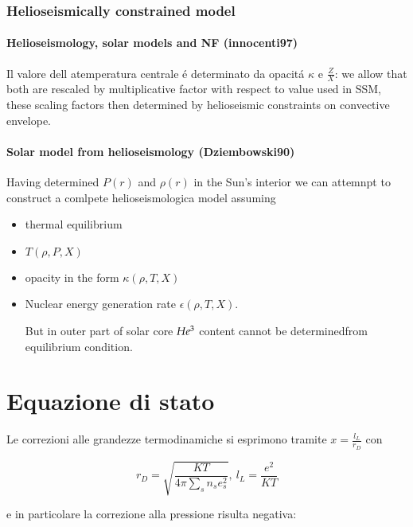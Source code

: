 \documentclass[oneside,12pt,fleqn]{memoir}
\begin{document}
\clearpage

\subsection{Helioseismically constrained model}

\subsubsection{Helioseismology, solar models and NF (innocenti97)}

Il valore dell atemperatura centrale \'e determinato da opacit\'a $\kappa$ e $\frac{Z}{X}$: we allow that both are rescaled by multiplicative factor with respect to value used in SSM, these scaling factors then determined by helioseismic constraints on convective envelope.

\subsubsection{Solar model from helioseismology (Dziembowski90)}

Having determined $P(r)$ and $\rho(r)$ in the Sun's interior we can attemnpt to construct a comlpete helioseismologica model assuming

\begin{itemize}
    \item thermal equilibrium
    \item $T(\rho,P,X)$
    \item opacity in the form $\kappa(\rho,T,X)$
    \item Nuclear energy generation rate $\epsilon(\rho,T,X)$.
    
    But in outer part of solar core $He\indices{^3}$ content cannot be determinedfrom equilibrium condition.
\end{itemize}


\chapter{Equazione di stato}
\PartialToc

Le correzioni alle grandezze termodinamiche si esprimono tramite $x=\frac{l_L}{r_D}$ con

\begin{equation*}
r_D=\sqrt{\frac{KT}{4\pi\sum_sn_se_s^2}},\ l_L=\frac{e^2}{KT}
\end{equation*}

e in particolare la correzione alla pressione risulta negativa:
\end{document}
